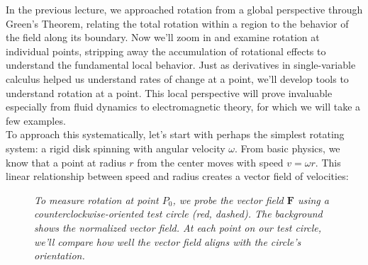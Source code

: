 \noindent In the previous lecture, we approached rotation from a global perspective through Green's Theorem, relating the total rotation within a region to the behavior of the field along its boundary. Now we'll zoom in and examine rotation at individual points, stripping away the accumulation of rotational effects to understand the fundamental local behavior. Just as derivatives in single-variable calculus helped us understand rates of change at a point, we'll develop tools to understand rotation at a point. This local perspective will prove invaluable especially from fluid dynamics to electromagnetic theory, for which we will take a few examples. \\

\noindent To approach this systematically, let's start with perhaps the simplest rotating system: a rigid disk spinning with angular velocity $\omega$. From basic physics, we know that a point at radius $r$ from the center moves with speed $v = \omega r$. This linear relationship between speed and radius creates a vector field of velocities:

\begin{figure}[H]
\centering
{}
\caption{\textit{To measure rotation at point $P_0$, we probe the vector field $\mathbf{F}$ using a counterclockwise-oriented test circle (red, dashed). The background shows the normalized vector field. At each point on our test circle, we'll compare how well the vector field aligns with the circle's orientation.}}
\label{fig:curl_probe}
\end{figure}

